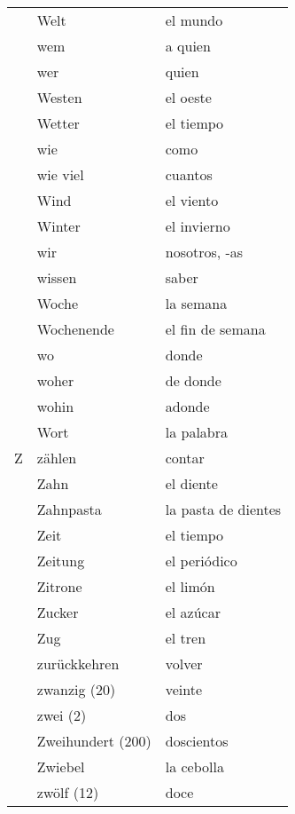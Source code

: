 \documentclass[10pt,spanish]{article}
\begin{document}
\begin{longtable}{p{} p{} | p{}}
& Welt & el mundo \\
& wem & a quien  \\
& wer & quien  \\
& Westen & el oeste  \\
& Wetter & el tiempo  \\
& wie & como  \\
& wie viel& cuantos  \\
& Wind & el viento  \\
& Winter & el invierno  \\
& wir & nosotros, -as\\
& wissen & saber  \\
& Woche & la semana  \\
& Wochenende & el fin de semana  \\
& wo & donde  \\
& woher & de donde  \\
& wohin & adonde  \\
& Wort & la palabra \\
Z & zählen & contar  \\
& Zahn & el diente \\
& Zahnpasta & la pasta de dientes \\
& Zeit & el tiempo  \\
& Zeitung & el periódico  \\
& Zitrone & el limón \\
& Zucker & el azúcar  \\
& Zug & el tren  \\
& zurückkehren & volver  \\
& zwanzig (20) & veinte  \\
& zwei (2) & dos  \\
& Zweihundert (200) & doscientos  \\
& Zwiebel & la cebolla  \\
& zwölf (12) & doce \\
\end{longtable}
\end{document}
